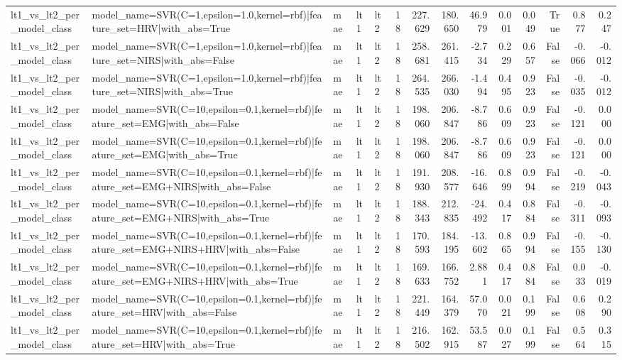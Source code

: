 \begin{table}
\begin{tabular}{lllllrrrrrrrrr}
lt1_vs_lt2_per_model_class & model_name=SVR(C=1,epsilon=1.0,kernel=rbf)|feature_set=HRV|with_abs=True & mae & lt1 & lt2 & 18 & 227.629 & 180.650 & 46.979 & 0.001 & 0.049 & True & 0.877 & 0.247 \\
lt1_vs_lt2_per_model_class & model_name=SVR(C=1,epsilon=1.0,kernel=rbf)|feature_set=NIRS|with_abs=False & mae & lt1 & lt2 & 18 & 258.681 & 261.415 & -2.734 & 0.229 & 0.657 & False & -0.066 & -0.012 \\
lt1_vs_lt2_per_model_class & model_name=SVR(C=1,epsilon=1.0,kernel=rbf)|feature_set=NIRS|with_abs=True & mae & lt1 & lt2 & 18 & 264.535 & 266.030 & -1.494 & 0.495 & 0.923 & False & -0.035 & -0.012 \\
lt1_vs_lt2_per_model_class & model_name=SVR(C=10,epsilon=0.1,kernel=rbf)|feature_set=EMG|with_abs=False & mae & lt1 & lt2 & 18 & 198.060 & 206.847 & -8.786 & 0.609 & 0.923 & False & -0.121 & 0.000 \\
lt1_vs_lt2_per_model_class & model_name=SVR(C=10,epsilon=0.1,kernel=rbf)|feature_set=EMG|with_abs=True & mae & lt1 & lt2 & 18 & 198.060 & 206.847 & -8.786 & 0.609 & 0.923 & False & -0.121 & 0.000 \\
lt1_vs_lt2_per_model_class & model_name=SVR(C=10,epsilon=0.1,kernel=rbf)|feature_set=EMG+NIRS|with_abs=False & mae & lt1 & lt2 & 18 & 191.930 & 208.577 & -16.646 & 0.899 & 0.994 & False & -0.219 & -0.043 \\
lt1_vs_lt2_per_model_class & model_name=SVR(C=10,epsilon=0.1,kernel=rbf)|feature_set=EMG+NIRS|with_abs=True & mae & lt1 & lt2 & 18 & 188.343 & 212.835 & -24.492 & 0.417 & 0.884 & False & -0.311 & -0.093 \\
lt1_vs_lt2_per_model_class & model_name=SVR(C=10,epsilon=0.1,kernel=rbf)|feature_set=EMG+NIRS+HRV|with_abs=False & mae & lt1 & lt2 & 18 & 170.593 & 184.195 & -13.602 & 0.865 & 0.994 & False & -0.155 & -0.130 \\
lt1_vs_lt2_per_model_class & model_name=SVR(C=10,epsilon=0.1,kernel=rbf)|feature_set=EMG+NIRS+HRV|with_abs=True & mae & lt1 & lt2 & 18 & 169.633 & 166.752 & 2.881 & 0.417 & 0.884 & False & 0.033 & -0.019 \\
lt1_vs_lt2_per_model_class & model_name=SVR(C=10,epsilon=0.1,kernel=rbf)|feature_set=HRV|with_abs=False & mae & lt1 & lt2 & 18 & 221.449 & 164.379 & 57.070 & 0.021 & 0.199 & False & 0.608 & 0.290 \\
lt1_vs_lt2_per_model_class & model_name=SVR(C=10,epsilon=0.1,kernel=rbf)|feature_set=HRV|with_abs=True & mae & lt1 & lt2 & 18 & 216.502 & 162.915 & 53.587 & 0.027 & 0.199 & False & 0.564 & 0.315 \\

\end{tabular}
\end{table}
